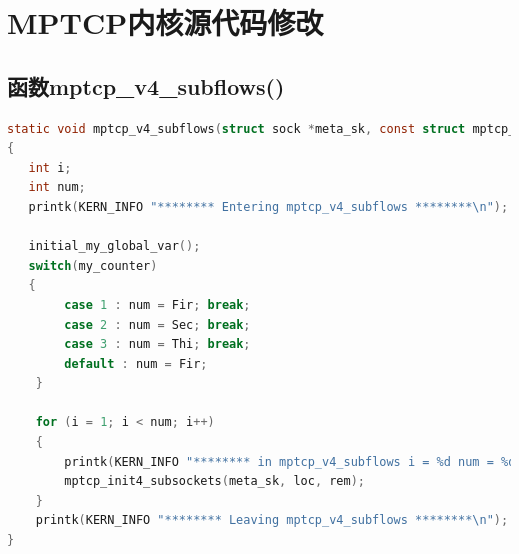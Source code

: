 \documentclass[winfonts,master,oneside,nobackinfo]{njuthesis}
\begin{document}







\appendix
\chapter{MPTCP内核源代码修改}\label{app:1}
\section{函数mptcp\_v4\_subflows()}
\begin{lstlisting}[language=C]
static void mptcp_v4_subflows(struct sock *meta_sk, const struct mptcp_loc4 *loc, struct mptcp_rem4 *rem)
{
   int i;
   int num;
   printk(KERN_INFO "******** Entering mptcp_v4_subflows ********\n");

   initial_my_global_var();
   switch(my_counter)
   {
		case 1 : num = Fir; break;
		case 2 : num = Sec; break;
		case 3 : num = Thi; break;
		default : num = Fir;
	}

	for (i = 1; i < num; i++)
	{
		printk(KERN_INFO "******** in mptcp_v4_subflows i = %d num = %d********\n",i,num);
		mptcp_init4_subsockets(meta_sk, loc, rem);
	}
	printk(KERN_INFO "******** Leaving mptcp_v4_subflows ********\n");
}
\end{lstlisting}
\end{document}
